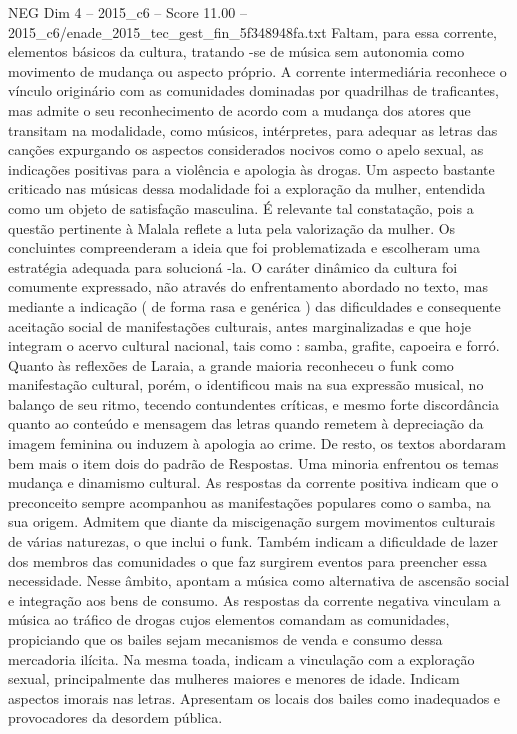 \begin{textsample}{NEG Dim 4 – 2015\_c6 – Score 11.00 – 2015\_c6/enade\_2015\_tec\_gest\_fin\_5f348948fa.txt}
Faltam, para essa corrente, elementos básicos da cultura, tratando -se de música sem autonomia como movimento de mudança ou aspecto próprio.
A corrente intermediária reconhece o vínculo originário com as comunidades dominadas por quadrilhas de traficantes, mas admite o seu reconhecimento de acordo com a mudança dos atores que transitam na modalidade, como músicos, intérpretes, para adequar as letras das canções expurgando os aspectos considerados nocivos como o apelo sexual, as indicações positivas para a violência e apologia às drogas.
Um aspecto bastante criticado nas músicas dessa modalidade foi a exploração da mulher, entendida como um objeto de satisfação masculina.
É relevante tal constatação, pois a questão pertinente à Malala reflete a luta pela valorização da mulher.
Os concluintes compreenderam a ideia que foi problematizada e escolheram uma estratégia adequada para solucioná -la.
O caráter dinâmico da cultura foi comumente expressado, não através do enfrentamento abordado no texto, mas mediante a indicação ( de forma rasa e genérica ) das dificuldades e consequente aceitação social de manifestações culturais, antes marginalizadas e que hoje integram o acervo cultural nacional, tais como : samba, grafite, capoeira e forró.
Quanto às reflexões de Laraia, a grande maioria reconheceu o funk como manifestação cultural, porém, o identificou mais na sua expressão musical, no balanço de seu ritmo, tecendo contundentes críticas, e mesmo forte discordância quanto ao conteúdo e mensagem das letras quando remetem à depreciação da imagem feminina ou induzem à apologia ao crime.
De resto, os textos abordaram bem mais o item dois do padrão de Respostas.
Uma minoria enfrentou os temas mudança e dinamismo cultural.
As respostas da corrente positiva indicam que o preconceito sempre acompanhou as manifestações populares como o samba, na sua origem.
Admitem que diante da miscigenação surgem movimentos culturais de várias naturezas, o que inclui o funk.
Também indicam a dificuldade de lazer dos membros das comunidades o que faz surgirem eventos para preencher essa necessidade.
Nesse âmbito, apontam a música como alternativa de ascensão social e integração aos bens de consumo.
As respostas da corrente negativa vinculam a música ao tráfico de drogas cujos elementos comandam as comunidades, propiciando que os bailes sejam mecanismos de venda e consumo dessa mercadoria ilícita.
Na mesma toada, indicam a vinculação com a exploração sexual, principalmente das mulheres maiores e menores de idade.
Indicam aspectos imorais nas letras.
Apresentam os locais dos bailes como inadequados e provocadores da desordem pública.

\end{textsample}

